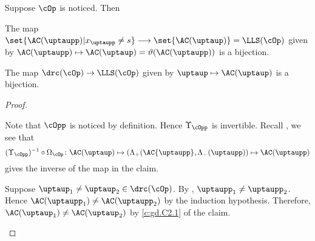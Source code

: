 \documentclass[ssunip]{subfiles}
\begin{document}
\begin{lem}\label{c:gd.C2}
  Suppose $\cOp$ is noticed. Then
  \begin{enumT}
    \item \label{c:gd.C2.1}The map
$\set{\oAC{\uptaupp}| x_{\uptaupp}\neq s}\longrightarrow \set{\oAC{\uptaup}}=\LLS(\cOp)$ given by
$\oAC{\uptaupp}\mapsto \oAC{\uptaup}=\vartheta(\oAC{\uptaupp})$ is a bijection.
\item
The map $\drc(\cOp)\rightarrow \LLS(\cOp)$ given by $\uptaup\mapsto \oAC{\uptaup}$ is a bijection.
\end{enumT}
\end{lem}
\begin{proof} %
  \begin{enumPF}
    \item
  Note that $\cOpp$ is noticed by definition. Hence $\Upsilon_{\cOpp}$ is invertible.
  Recall , we see that
  \[
    (\Upsilon_{\cOpp})^{-1}\circ \Omega_{\cOp}\colon
    \oAC{\uptaup}\mapsto (\Lambda_+(\AC{\uptaupp},\nAC{\uptaupp})\mapsto \oAC{\uptaupp}
  \]
  gives the inverse of the map in the claim.
  \item
  Suppose $\uptaup_{1}\neq \uptaup_{2}\in \drc(\cOp)$. By ,
  $\uptaupp_{1}\neq \uptaupp_{2}$. Hence
  $\oAC{\uptaupp_{1}}\neq\oAC{\uptaupp_{2}}$ by the induction hypothesis.
  Therefore, $\oAC{\uptaup_{1}}\neq \oAC{\uptaup_{2}}$ by \ref{c:gd.C2.1}
  of the claim.
\end{enumPF}
\end{proof}
\end{document}
